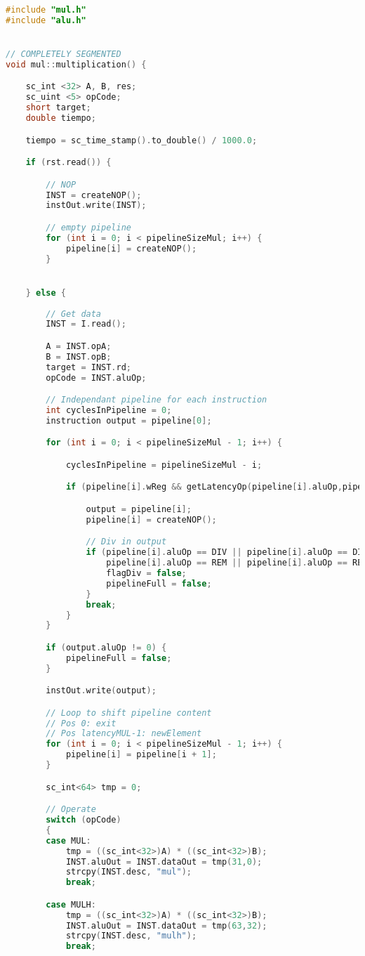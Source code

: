 \begin{lstlisting}[language=C++]
#include "mul.h"
#include "alu.h"


// COMPLETELY SEGMENTED
void mul::multiplication() { 

	sc_int <32> A, B, res;
	sc_uint <5> opCode;
	short target;
	double tiempo;

	tiempo = sc_time_stamp().to_double() / 1000.0;

	if (rst.read()) {

		// NOP
		INST = createNOP();
		instOut.write(INST); 

		// empty pipeline
		for (int i = 0; i < pipelineSizeMul; i++) {
			pipeline[i] = createNOP();
		}


	} else {
		
		// Get data
		INST = I.read();

		A = INST.opA;
		B = INST.opB;
		target = INST.rd;
		opCode = INST.aluOp;

		// Independant pipeline for each instruction 
		int cyclesInPipeline = 0;
		instruction output = pipeline[0];

		for (int i = 0; i < pipelineSizeMul - 1; i++) {

			cyclesInPipeline = pipelineSizeMul - i;

			if (pipeline[i].wReg && getLatencyOp(pipeline[i].aluOp,pipeline[i].target) <= cyclesInPipeline) {

				output = pipeline[i];
				pipeline[i] = createNOP();

				// Div in output
				if (pipeline[i].aluOp == DIV || pipeline[i].aluOp == DIVU || 
					pipeline[i].aluOp == REM || pipeline[i].aluOp == REMU ) {
					flagDiv = false;
					pipelineFull = false;
				}
				break;
			}
		}

		if (output.aluOp != 0) {
			pipelineFull = false;
		}

		instOut.write(output);

		// Loop to shift pipeline content
		// Pos 0: exit
		// Pos latencyMUL-1: newElement
		for (int i = 0; i < pipelineSizeMul - 1; i++) {
			pipeline[i] = pipeline[i + 1];
		}

		sc_int<64> tmp = 0;

		// Operate
		switch (opCode)
		{
		case MUL: 
			tmp = ((sc_int<32>)A) * ((sc_int<32>)B);
			INST.aluOut = INST.dataOut = tmp(31,0);
			strcpy(INST.desc, "mul");
			break;

		case MULH: 
			tmp = ((sc_int<32>)A) * ((sc_int<32>)B);
			INST.aluOut = INST.dataOut = tmp(63,32);
			strcpy(INST.desc, "mulh");
			break;


\end{lstlisting}
